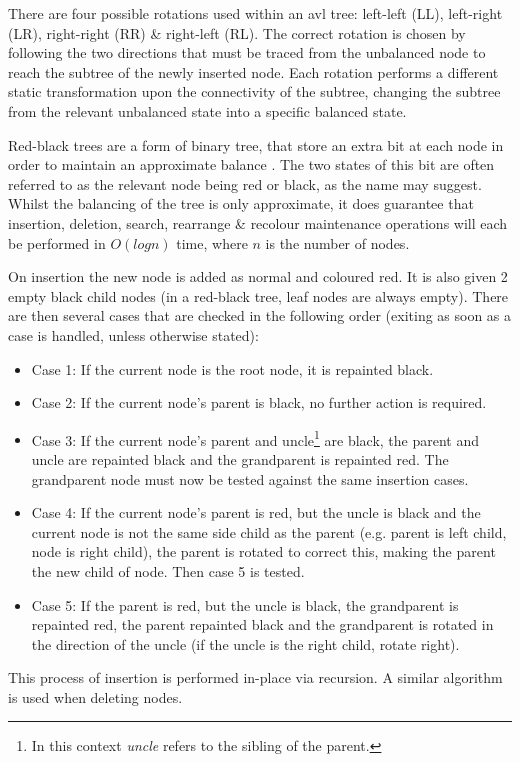         There are four possible rotations used within an \gls{avl} tree: left-left (LL), left-right (LR), right-right (RR) \& right-left (RL). The correct rotation is chosen by following the two directions that must be traced from the unbalanced node to reach the subtree of the newly inserted node. Each rotation performs a different static transformation upon the connectivity of the subtree, changing the subtree from the relevant unbalanced state into a specific balanced state.
        
        Red-black trees are a form of binary tree, that store an extra bit at each node in order to maintain an approximate balance \cite{GS78}. The two states of this bit are often referred to as the relevant node being red or black, as the name may suggest. Whilst the balancing of the tree is only approximate, it does guarantee that insertion, deletion, search, rearrange \& recolour maintenance operations will each be performed in $O(log n)$ time, where $n$ is the number of nodes.
        
        On insertion the new node is added as normal and coloured red. It is also given 2 empty black child nodes (in a red-black tree, leaf nodes are always empty). There are then several cases that are checked in the following order (exiting as soon as a case is handled, unless otherwise stated):
        \begin{itemize}
          \item{Case 1: If the current node is the root node, it is repainted black.}
          \item{Case 2: If the current node's parent is black, no further action is required.}
          \item{Case 3: If the current node's parent and uncle\footnote{In this context \textit{uncle} refers to the sibling of the parent.} are black, the parent and uncle are repainted black and the grandparent is repainted red. The grandparent node must now be tested against the same insertion cases.}
          \item{Case 4: If the current node's parent is red, but the uncle is black and the current node is not the same side child as the parent (e.g. parent is left child, node is right child), the parent is rotated to correct this, making the parent the new child of node. Then case 5 is tested.}
          \item{Case 5: If the parent is red, but the uncle is black, the grandparent is repainted red, the parent repainted black and the grandparent is rotated in the direction of the uncle (if the uncle is the right child, rotate right). }
        \end{itemize}
        This process of insertion is performed in-place via recursion. A similar algorithm is used when deleting nodes.
      

